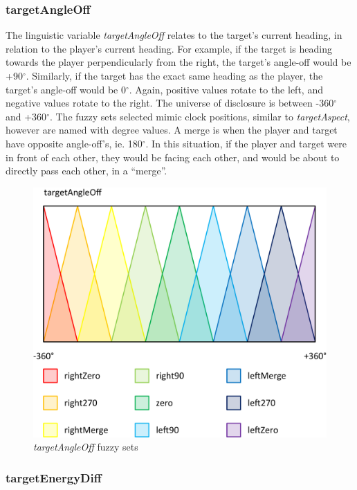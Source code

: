 \subsubsection{targetAngleOff}

The linguistic variable \emph{targetAngleOff} relates to the target's current heading, in relation to the player's current heading. For example, if the target is heading towards the player perpendicularly from the right, the target's angle-off would be +90$^{\circ}$. Similarly, if the target has the exact same heading as the player, the target's angle-off would be 0$^{\circ}$. Again, positive values rotate to the left, and negative values rotate to the right. The universe of disclosure is between -360$^{\circ}$ and +360$^{\circ}$. The fuzzy sets selected mimic clock positions, similar to \emph{targetAspect}, however are named with degree values. A merge is when the player and target have opposite angle-off's, ie. 180$^{\circ}$. In this situation, if the player and target were in front of each other, they would be facing each other, and would be about to directly pass each other, in a ``merge''.

\begin{figure}[H]
\centering
\caption{\emph{targetAngleOff} fuzzy sets}
\includegraphics[scale=0.08]{./img/pdf/targetAngleOffSets.pdf}
\end{figure}

\subsubsection{targetEnergyDiff}

